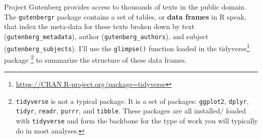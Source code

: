 \documentclass[
]{article}
\DeclareRobustCommand{\href}[2]{#2\footnote{\url{#1}}}
\begin{document}
Project Gutenberg provides access to thousands of texts in the public domain. The \texttt{gutenbergr} package contains a set of tables, or \textbf{data frames} in R speak, that index the meta-data for these texts broken down by text (\texttt{gutenberg\_metadata}), author (\texttt{gutenberg\_authors}), and subject (\texttt{gutenberg\_subjects}). I'll use the \texttt{glimpse()} function loaded in the \href{https://CRAN.R-project.org/package=tidyverse}{tidyverse} package \footnote{\texttt{tidyverse} is not a typical package. It is a set of packages: \texttt{ggplot2}, \texttt{dplyr}, \texttt{tidyr}, \texttt{readr}, \texttt{purrr}, and \texttt{tibble}. These packages are all installed/ loaded with \texttt{tidyverse} and form the backbone for the type of work you will typically do in most analyses.} to summarize the structure of these data frames.
\end{document}
